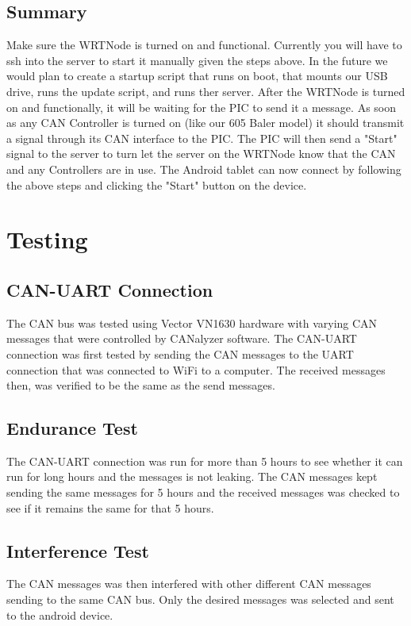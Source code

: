 \documentclass[paper=a4, fontsize=11pt]{scrartcl}
\numberwithin{equation}{section}		%
\numberwithin{figure}{section}			%
\numberwithin{table}{section}				%
\begin{document}
 \subsection{Summary} 
 Make sure the WRTNode is turned on and functional. Currently you will have to ssh into the server to start it manually given the steps above. In the future we would plan to create a startup script that runs on boot, that mounts our USB drive, runs the update script, and runs ther server. After the WRTNode is turned on and functionally, it will be waiting for the PIC to send it a  message. As soon as any CAN Controller is turned on (like our 605 Baler model) it should transmit a signal through its CAN interface to the PIC. The PIC will then send a "Start" signal to the server to turn let the server on the WRTNode know that the CAN and any Controllers are in use. The Android tablet can now connect by following the above steps and clicking the "Start" button on the device. \\


\section{Testing}
\subsection{CAN-UART Connection}
The CAN bus was tested using Vector VN1630 hardware with varying CAN messages that were  controlled by CANalyzer software. The CAN-UART connection was first tested by sending the CAN messages to the UART connection that was connected to 	WiFi to a computer. The received messages then, was verified to be the same as the send messages. \\

\subsection{Endurance Test}
The CAN-UART connection was run for more than 5 hours to see whether it can run for long hours and the messages is not leaking. The CAN messages kept sending the same messages for 5 hours and the received messages was checked to see if it remains the same for that 5 hours. \\

\subsection{Interference Test}
The CAN messages was then interfered with other different CAN messages sending to the same CAN bus. Only the desired messages was selected and sent to the android device. \\
\end{document}
